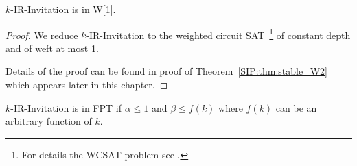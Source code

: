\begin{theorem} \label{SIP:thm:IR_invitation_W1}
	$k$-IR-Invitation is in W[1].
\end{theorem} 
\begin{proof}
	We reduce $k$-IR-Invitation to the weighted circuit SAT~\footnote{For details the WCSAT problem see \cite{creignou2015parameterized}.} of constant depth and of weft at most 1. 
	
	Details of the proof can be found in proof of Theorem~\ref{SIP:thm:stable_W2} which appears later in this chapter.
\end{proof}


\begin{theorem} \label{SIP:thm:IR_invitation_FPT}
	$k$-IR-Invitation is in FPT if $\alpha \leq 1$ and $\beta \leq f(k)$ where $f(k)$ can be an arbitrary function of $k$. 
\end{theorem}

